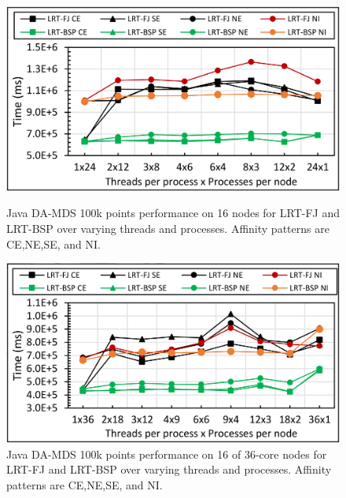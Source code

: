 \documentclass[10pt, conference, compsocconf]{IEEEtran}
\begin{document}
\begin{figure}[!htb]
	\begin{minipage}{0.49\textwidth}
        \centering
        \includegraphics[width=1\columnwidth]{images/fig_damds_100k_binding_patterns}
        \caption{Java DA-MDS 100k points performance on 16 nodes for \ac{LRT-FJ} and \ac{LRT-BSP} over varying threads and processes. Affinity patterns are CE,NE,SE, and NI.}
        \label{fig:fig_damds_100k_binding_patterns}
    \end{minipage}
    \hspace{1.4mm}
    \begin{minipage}{0.49\textwidth}
        \centering
        \includegraphics[width=1\columnwidth]{images/fig_damds_100k_binding_patterns_on_36core_nodes}
        \caption{Java DA-MDS 100k points performance on 16 of 36-core nodes for \ac{LRT-FJ} and \ac{LRT-BSP} over varying threads and processes. Affinity patterns are CE,NE,SE, and NI.}
        \label{fig:fig_damds_100k_binding_patterns_on_36core_nodes}
    \end{minipage}
\end{figure}
\end{document}
